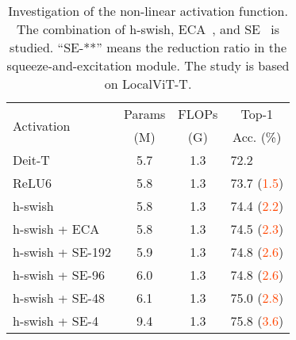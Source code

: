 \documentclass[10pt,twocolumn,letterpaper]{article}
\begin{document}
\begin{table}[!t]
    \small
    \begin{center}
        \begin{tabular}{l|c|c|l}
            \toprule
            \multirow{2}{*}{Activation}  & Params & FLOPs & \multicolumn{1}{c}{Top-1} \\ 
            & \multicolumn{1}{c|}{(M)} & \multicolumn{1}{c|}{(G)} & \multicolumn{1}{c}{Acc. (\%)} \\\midrule
            Deit-T~\cite{touvron2020training} & 5.7 & 1.3 & 72.2 \\ \midrule
            ReLU6           & 5.8 & 1.3 & 73.7 (\textcolor{OrangeRed}{1.5})\\
            h-swish         & 5.8 & 1.3 & 74.4 (\textcolor{OrangeRed}{2.2})\\
            h-swish + ECA   & 5.8 & 1.3 & 74.5 (\textcolor{OrangeRed}{2.3})\\
            h-swish + SE-192& 5.9 & 1.3 & 74.8 (\textcolor{OrangeRed}{2.6})\\
            h-swish + SE-96 & 6.0 & 1.3 & 74.8 (\textcolor{OrangeRed}{2.6})\\
            h-swish + SE-48 & 6.1 & 1.3 & 75.0 (\textcolor{OrangeRed}{2.8})\\
            h-swish + SE-4  & 9.4 & 1.3 & 75.8 (\textcolor{OrangeRed}{3.6})\\ \bottomrule
             
        \end{tabular}
    \end{center}
\caption{Investigation of the non-linear activation function. The combination of h-swish, ECA~\cite{wang2020efficient}, and SE~\cite{hu2018squeeze} is studied. ``SE-**'' means the reduction ratio in the squeeze-and-excitation module. The study is based on LocalViT-T.}
    \label{tbl:results_classification}
\end{table}
\end{document}

